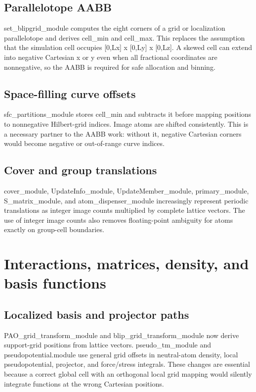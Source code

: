 \documentclass[10pt,a4paper]{report}
\begin{document}
\section{Parallelotope AABB}
set\_blipgrid\_module computes the eight corners of a grid or localization parallelotope and derives cell\_min and cell\_max. This replaces the assumption that the simulation cell occupies [0,Lx] x [0,Ly] x [0,Lz]. A skewed cell can extend into negative Cartesian x or y even when all fractional coordinates are nonnegative, so the AABB is required for safe allocation and binning.

\section{Space-filling curve offsets}
sfc\_partitions\_module stores cell\_min and subtracts it before mapping positions to nonnegative Hilbert-grid indices. Image atoms are shifted consistently. This is a necessary partner to the AABB work: without it, negative Cartesian corners would become negative or out-of-range curve indices.

\section{Cover and group translations}
cover\_module, UpdateInfo\_module, UpdateMember\_module, primary\_module, S\_matrix\_module, and atom\_dispenser\_module increasingly represent periodic translations as integer image counts multiplied by complete lattice vectors. The use of integer image counts also removes floating-point ambiguity for atoms exactly on group-cell boundaries.

\begin{center}\end{center}
\chapter{Interactions, matrices, density, and basis functions}
\section{Localized basis and projector paths}
PAO\_grid\_transform\_module and blip\_grid\_transform\_module now derive support-grid positions from lattice vectors. pseudo\_tm\_module and pseudopotential.module use general grid offsets in neutral-atom density, local pseudopotential, projector, and force/stress integrals. These changes are essential because a correct global cell with an orthogonal local grid mapping would silently integrate functions at the wrong Cartesian positions.
\end{document}
